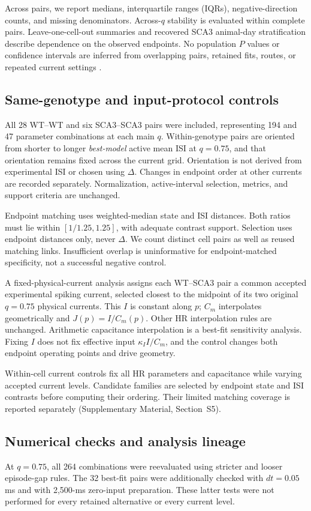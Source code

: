 \documentclass[utf8]{FrontiersinHarvard}
\newcommand{\sref}[1]{Supplementary Material, Section~#1}
\begin{document}
Across pairs, we report medians, interquartile ranges (IQRs), negative-direction counts, and missing denominators. Across-$q$ stability is evaluated within complete pairs. Leave-one-cell-out summaries and recovered SCA3 animal-day stratification describe dependence on the observed endpoints. No population $P$ values or confidence intervals are inferred from overlapping pairs, retained fits, routes, or repeated current settings \citep{lazic2010,lazic2018}.

\subsection{Same-genotype and input-protocol controls}\label{sec:controls}
All 28 WT--WT and six SCA3--SCA3 pairs were included, representing 194 and 47 parameter combinations at each main $q$. Within-genotype pairs are oriented from shorter to longer \emph{best-model} active mean ISI at $q=0.75$, and that orientation remains fixed across the current grid. Orientation is not derived from experimental ISI or chosen using $\Delta$. Changes in endpoint order at other currents are recorded separately. Normalization, active-interval selection, metrics, and support criteria are unchanged.

Endpoint matching uses weighted-median state and ISI distances. Both ratios must lie within $[1/1.25,1.25]$, with adequate contrast support. Selection uses endpoint distances only, never $\Delta$. We count distinct cell pairs as well as reused matching links. Insufficient overlap is uninformative for endpoint-matched specificity, not a successful negative control.

A fixed-physical-current analysis assigns each WT--SCA3 pair a common accepted experimental spiking current, selected closest to the midpoint of its two original $q=0.75$ physical currents. This $I$ is constant along $p$; $C_m$ interpolates geometrically and $J(p)=I/C_m(p)$. Other HR interpolation rules are unchanged. Arithmetic capacitance interpolation is a best-fit sensitivity analysis. Fixing $I$ does not fix effective input $\kappa_I I/C_m$, and the control changes both endpoint operating points and drive geometry.

Within-cell current controls fix all HR parameters and capacitance while varying accepted current levels. Candidate families are selected by endpoint state and ISI contrasts before computing their ordering. Their limited matching coverage is reported separately (\sref{S5}).

\subsection{Numerical checks and analysis lineage}\label{sec:lineage}
At $q=0.75$, all 264 combinations were reevaluated using stricter and looser episode-gap rules. The 32 best-fit pairs were additionally checked with $dt=0.05$ ms and with 2,500-ms zero-input preparation. These latter tests were not performed for every retained alternative or every current level.
\end{document}
